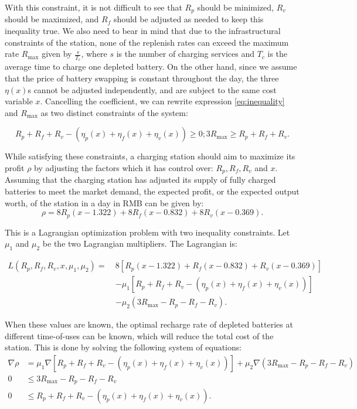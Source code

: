 \documentclass[10pt]{article}
\begin{document}
With this constraint, it is not difficult to see that $R_p$ should be minimized, $R_v$ should be maximized, and $R_f$ should be adjusted as needed to keep this inequality true. We also need to bear in mind that due to the infrastructural constraints of the station, none of the replenish rates can exceed the maximum rate $R_{\text{max}}$ given by $\frac{s}{T_c}$, where $s$ is the number of charging services and $T_c$ is the average time to charge one depleted battery. On the other hand, since we assume that the price of battery swapping is constant throughout the day, the three $\eta(x)$s cannot be adjusted independently, and are subject to the same cost variable $x$. Cancelling the coefficient, we can rewrite expression \eqref{eq:inequality} and $R_\text{max}$ as two distinct constraints of the system:

\begin{equation}
    R_p + R_f + R_v - \left(\eta_p(x) + \eta_f(x) + \eta_v(x)\right) \ge 0; 3R_\text{max} \ge R_p + R_f + R_v.
\end{equation}

While satisfying these constraints, a charging station should aim to maximize its profit $\rho$ by adjusting the factors which it has control over: $R_p, R_f, R_v$ and $x$. Assuming that the charging station has adjusted its supply of fully charged batteries to meet the market demand, the expected profit, or the expected output worth, of the station in a day in RMB can be given by:
\begin{equation}
    \rho =  8R_p(x - 1.322) + 8R_f(x - 0.832) + 8R_v(x - 0.369).
\end{equation}

This is a Lagrangian optimization problem with two inequality constraints. Let $\mu_1$ and $\mu_2$ be the two Lagrangian multipliers. The Lagrangian is:

\begin{align}
    L(R_p, R_f, R_v, x, \mu_1, \mu_2) =\  & 8\left[R_p(x - 1.322) + R_f(x - 0.832) + R_v(x - 0.369)\right]\\
    & - \mu_1\left[R_p + R_f + R_v - \left(\eta_p(x) + \eta_f(x) + \eta_v(x)\right)\right]\\
    & - \mu_2\left(3R_\text{max} - R_p - R_f - R_v\right).
\end{align}

When these values are known, the optimal recharge rate of depleted batteries at different time-of-uses can be known, which will reduce the total cost of the station. This is done by solving the following system of equations:
\begin{align*}
\nabla \rho & = \mu_1 \nabla \left[R_p + R_f + R_v - \left(\eta_p(x) + \eta_f(x) + \eta_v(x)\right)\right] + \mu_2 \nabla\left(3R_\text{max} - R_p - R_f - R_v\right)\\
0 & \le 3R_\text{max} - R_p - R_f - R_v\\
0 & \le R_p + R_f + R_v - \left(\eta_p(x) + \eta_f(x) + \eta_v(x)\right).
\end{align*}
\end{document}
